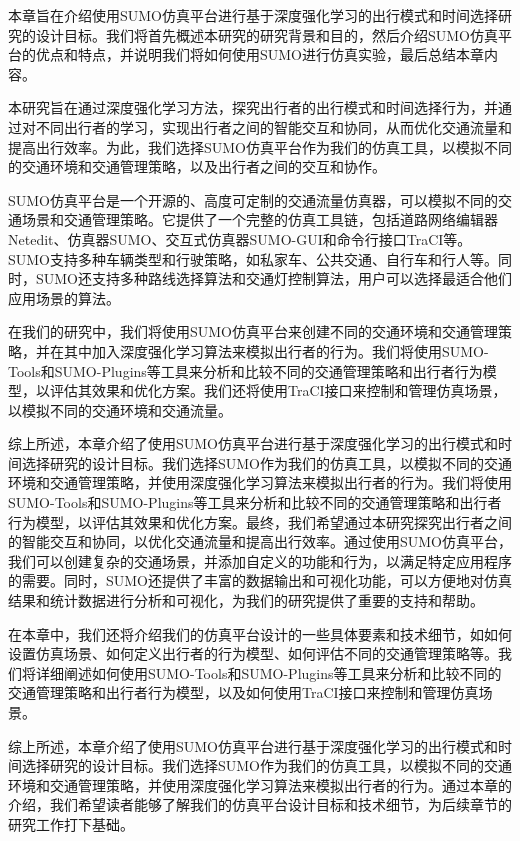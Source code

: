 本章旨在介绍使用SUMO仿真平台进行基于深度强化学习的出行模式和时间选择研究的设计目标。我们将首先概述本研究的研究背景和目的，然后介绍SUMO仿真平台的优点和特点，并说明我们将如何使用SUMO进行仿真实验，最后总结本章内容。

本研究旨在通过深度强化学习方法，探究出行者的出行模式和时间选择行为，并通过对不同出行者的学习，实现出行者之间的智能交互和协同，从而优化交通流量和提高出行效率。为此，我们选择SUMO仿真平台作为我们的仿真工具，以模拟不同的交通环境和交通管理策略，以及出行者之间的交互和协作。

SUMO仿真平台是一个开源的、高度可定制的交通流量仿真器，可以模拟不同的交通场景和交通管理策略。它提供了一个完整的仿真工具链，包括道路网络编辑器Netedit、仿真器SUMO、交互式仿真器SUMO-GUI和命令行接口TraCI等。SUMO支持多种车辆类型和行驶策略，如私家车、公共交通、自行车和行人等。同时，SUMO还支持多种路线选择算法和交通灯控制算法，用户可以选择最适合他们应用场景的算法。

在我们的研究中，我们将使用SUMO仿真平台来创建不同的交通环境和交通管理策略，并在其中加入深度强化学习算法来模拟出行者的行为。我们将使用SUMO-Tools和SUMO-Plugins等工具来分析和比较不同的交通管理策略和出行者行为模型，以评估其效果和优化方案。我们还将使用TraCI接口来控制和管理仿真场景，以模拟不同的交通环境和交通流量。

综上所述，本章介绍了使用SUMO仿真平台进行基于深度强化学习的出行模式和时间选择研究的设计目标。我们选择SUMO作为我们的仿真工具，以模拟不同的交通环境和交通管理策略，并使用深度强化学习算法来模拟出行者的行为。我们将使用SUMO-Tools和SUMO-Plugins等工具来分析和比较不同的交通管理策略和出行者行为模型，以评估其效果和优化方案。最终，我们希望通过本研究探究出行者之间的智能交互和协同，以优化交通流量和提高出行效率。通过使用SUMO仿真平台，我们可以创建复杂的交通场景，并添加自定义的功能和行为，以满足特定应用程序的需要。同时，SUMO还提供了丰富的数据输出和可视化功能，可以方便地对仿真结果和统计数据进行分析和可视化，为我们的研究提供了重要的支持和帮助。

在本章中，我们还将介绍我们的仿真平台设计的一些具体要素和技术细节，如如何设置仿真场景、如何定义出行者的行为模型、如何评估不同的交通管理策略等。我们将详细阐述如何使用SUMO-Tools和SUMO-Plugins等工具来分析和比较不同的交通管理策略和出行者行为模型，以及如何使用TraCI接口来控制和管理仿真场景。

综上所述，本章介绍了使用SUMO仿真平台进行基于深度强化学习的出行模式和时间选择研究的设计目标。我们选择SUMO作为我们的仿真工具，以模拟不同的交通环境和交通管理策略，并使用深度强化学习算法来模拟出行者的行为。通过本章的介绍，我们希望读者能够了解我们的仿真平台设计目标和技术细节，为后续章节的研究工作打下基础。
 

